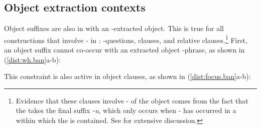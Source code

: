 \documentclass[output=paper,
modfonts
]{langscibook}
\begin{document}
\subsection{Object extraction contexts}\label{sec:baier:2.2}

Object suffixes are also in  with an \abar-extracted object. This is true for all constructions that involve \abar- in : \wh-questions,  clauses, and relative clauses.\footnote{Evidence that these clauses involve \abar- of the object comes from the fact that the  takes the final suffix \textit{-u}, which only occurs when \abar- has occurred in a  within which the  is contained. See \citet{Baier:2014} for extensive discussion.} First, an object suffix cannot co-occur with an extracted object \wh-phrase, as shown in (\ref{dist:wh.ban}a-b):

\begin{exe}
\ex \label{dist:wh.ban}
\begin{xlista}

\end{xlista}
\end{exe}

\noindent This constraint is also active in object  clauses, as shown in (\ref{dist:focus.ban}a-b):

\begin{exe}
\ex \label{dist:focus.ban}
\begin{xlista}

\end{xlista}
\end{exe}
\end{document}
